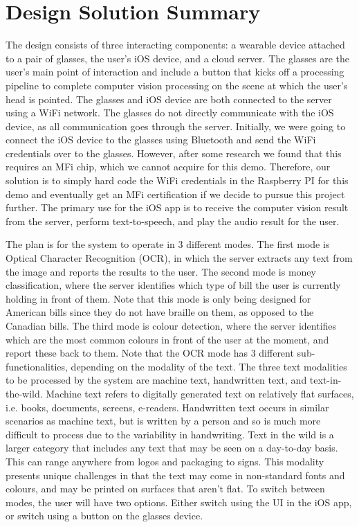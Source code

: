 \documentclass[a4paper,11pt]{article}
\begin{document}
\section{Design Solution Summary}
The design consists of three interacting components: a wearable device attached to a pair of glasses, the user's iOS device, and a cloud server. The glasses are the user's main point of interaction and include a button that kicks off a processing pipeline to complete computer vision processing on the scene at which the user's head is pointed. The glasses and iOS device are both connected to the server using a WiFi network. The glasses do not directly communicate with the iOS device, as all communication goes through the server. Initially, we were going to connect the iOS device to the glasses using Bluetooth and send the WiFi credentials over to the glasses. However, after some research we found that this requires an MFi chip, which we cannot acquire for this demo. Therefore, our solution is to simply hard code the WiFi credentials in the Raspberry PI for this demo and eventually get an MFi certification if we decide to pursue this project further. The primary use for the iOS app is to receive the computer vision result from the server, perform text-to-speech, and play the audio result for the user.

The plan is for the system to operate in 3 different modes. The first mode is Optical Character Recognition (OCR), in which the server extracts any text from the image and reports the results to the user. The second mode is money classification, where the server identifies which type of bill the user is currently holding in front of them. Note that this mode is only being designed for American bills since they do not have braille on them, as opposed to the Canadian bills. The third mode is colour detection, where the server identifies which are the most common colours in front of the user at the moment, and report these back to them. Note that the OCR mode has 3 different sub-functionalities, depending on the modality of the text. The three text modalities to be processed by the system are machine text, handwritten text, and text-in-the-wild. Machine text refers to digitally generated text on relatively flat surfaces, i.e. books, documents, screens, e-readers. Handwritten text occurs in similar scenarios as machine text, but is written by a person and so is much more difficult to process due to the variability in handwriting. Text in the wild is a larger category that includes any text that may be seen on a day-to-day basis. This can range anywhere from logos and packaging to signs. This modality presents unique challenges in that the text may come in non-standard fonts and colours, and may be printed on surfaces that aren't flat. To switch between modes, the user will have two options. Either switch using the UI in the iOS app, or switch using a button on the glasses device.
\end{document}
